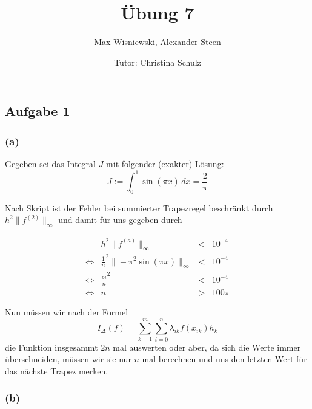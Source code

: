 \documentclass[11pt,a4paper,ngerman]{article}
\date{Tutor: Christina Schulz}
\title{Übung 7}
\author{Max Wisniewski, Alexander Steen}
\begin{document}

\renewcommand{\figurename}{Figure}

\maketitle
\thispagestyle{fancy}

\subsection*{Aufgabe 1}

\subsubsection*{(a)}

Gegeben sei das Integral $J$ mit folgender (exakter) Lösung:
\begin{equation*}
    J := \int_0^1 \sin(\pi x) \, dx = \frac{2}{\pi}
\end{equation*}

Nach Skript ist der Fehler bei summierter Trapezregel beschränkt durch $h^2 \|f^{(2)} \|_\infty$ und damit für uns gegeben durch

\begin{equation*}\begin{array}{crcl}
    & h^2 \| f^{(a)} \|_\infty &<& 10^{-4}\\
\Leftrightarrow & \frac{1}{n}^2 \| -\pi^2 \sin (\pi x) \|_\infty &<& 10^{-4}\\
\Leftrightarrow & \frac{pi}{n}^2 &<& 10^{-4}\\
\Leftrightarrow & n &>& 100 \pi
\end{array}\end{equation*}

Nun müssen wir nach der Formel
$$
    I_\Delta (f) = \overset{m}{\underset{k=1}{\sum}} \overset{n}{\underset{i=0}{\sum}} \lambda_{ik} f(x_{ik}) h_k
$$
die Funktion insgesammt $2n$ mal auswerten oder aber, da sich die Werte immer überschneiden, müssen wir sie nur $n$ mal berechnen
und uns den letzten Wert für das nächste Trapez merken.

\subsubsection*{(b)}
\end{document}
